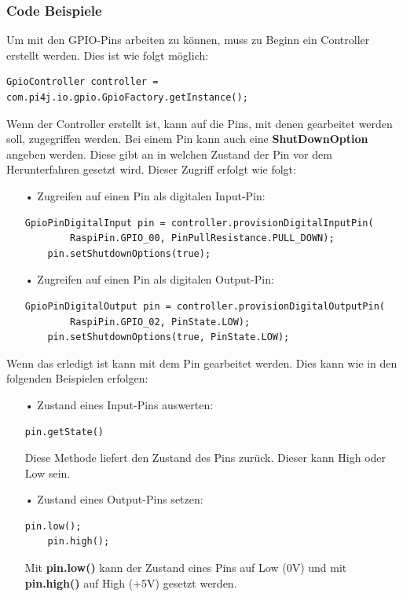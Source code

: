 \subsubsection{Code Beispiele}
Um mit den \ac{GPIO}-Pins arbeiten zu können, muss zu Beginn ein Controller erstellt werden. Dies ist wie folgt möglich:
\begin{lstlisting}[style=JavaStyle, caption=\ac{GPIO}-Controller erstellen]
	GpioController controller = com.pi4j.io.gpio.GpioFactory.getInstance();
\end{lstlisting}
Wenn der Controller erstellt ist, kann auf die Pins, mit denen gearbeitet werden soll, zugegriffen werden. Bei einem Pin kann auch eine \textbf{ShutDownOption} angeben werden. Diese gibt an in welchen Zustand der Pin vor dem Herunterfahren gesetzt wird. Dieser Zugriff erfolgt wie folgt: 
\begin{itemize}
\item[•] Zugreifen auf einen Pin als digitalen Input-Pin:
\begin{lstlisting}[style=JavaStyle, caption=Zugriff auf einen Pin als Input]
	GpioPinDigitalInput pin = controller.provisionDigitalInputPin(
		RaspiPin.GPIO_00, PinPullResistance.PULL_DOWN);
	pin.setShutdownOptions(true);
\end{lstlisting}
\item[•] Zugreifen auf einen Pin als digitalen Output-Pin:
\begin{lstlisting}[style=JavaStyle, caption=Zugriff auf einen Pin als Output]
	GpioPinDigitalOutput pin = controller.provisionDigitalOutputPin(
		RaspiPin.GPIO_02, PinState.LOW);
	pin.setShutdownOptions(true, PinState.LOW);
\end{lstlisting}
\end{itemize}
Wenn das erledigt ist kann mit dem Pin gearbeitet werden. Dies kann wie in den folgenden Beispielen erfolgen:
\begin{itemize}
\item[•] Zustand eines Input-Pins auswerten: 
\begin{lstlisting}[style=JavaStyle, caption=Pinzustand abfragen]
	pin.getState()
\end{lstlisting}
Diese Methode liefert den Zustand des Pins zurück. Dieser kann High oder Low sein.

\newpage

\item[•] Zustand eines Output-Pins setzen:
\begin{lstlisting}[style=JavaStyle, caption=Pinzustand verändern]
	pin.low();	
	pin.high();
\end{lstlisting}
Mit \textbf{pin.low()} kann der Zustand eines Pins auf Low (0V) und mit \textbf{pin.high()} auf High (+5V) gesetzt werden. 
\end{itemize}

